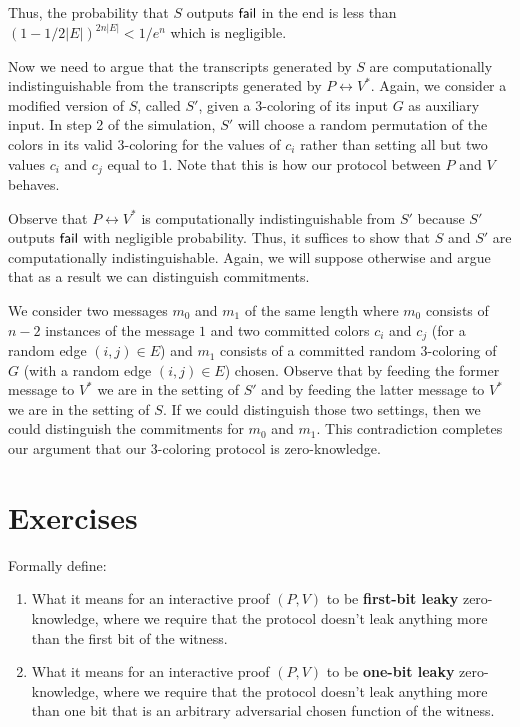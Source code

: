 Thus, the probability that $S$ outputs $\sf{fail}$ in the end is less than $(1 - 1/2|E|)^{2n|E|} < 1/e^n$ which is negligible.

Now we need to argue that the transcripts generated by $S$ are computationally indistinguishable from the transcripts generated by $P \leftrightarrow V^*$. Again, we consider a modified version of $S$, called $S'$, given a 3-coloring of its input $G$ as auxiliary input. In step 2 of the simulation, $S'$ will choose a random permutation of the colors in its valid 3-coloring for the values of $c_i$ rather than setting all but two values $c_i$ and $c_j$ equal to 1. Note that this is how our protocol between $P$ and $V$ behaves.

Observe that $P \leftrightarrow V^*$ is computationally indistinguishable from $S'$ because $S'$ outputs $\sf{fail}$ with negligible probability. Thus, it suffices to show that $S$ and $S'$ are computationally indistinguishable. Again, we will suppose otherwise and argue that as a result we can distinguish commitments.

We consider two messages $m_0$ and $m_1$ of the same length where $m_0$ consists of $n-2$ instances of the message $1$ and two committed colors $c_i$ and $c_j$ (for a random edge $(i, j) \in E$) and $m_1$ consists of a committed random 3-coloring of $G$ (with a random edge $(i, j) \in E$) chosen. Observe that by feeding the former message to $V^*$ we are in the setting of $S'$ and by feeding the latter message to $V^*$ we are in the setting of $S$. If we could distinguish those two settings, then we could distinguish the commitments for $m_0$ and $m_1$. This contradiction completes our argument that our 3-coloring protocol is zero-knowledge.

\section*{Exercises}
\begin{exercise} Formally define:
\begin{enumerate}
  \item 
What it means for an  interactive proof $(P,V)$ to be \textbf{first-bit leaky} zero-knowledge, where we require that the protocol doesn't leak anything more than the first bit of the witness.

\item What it means for an  interactive proof $(P,V)$ to be \textbf{one-bit leaky} zero-knowledge, where we require that the protocol doesn't leak anything more than one bit that is an arbitrary adversarial chosen function of the witness.
    \end{enumerate}
\end{exercise}

